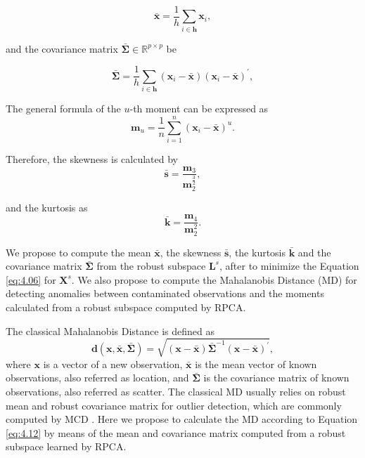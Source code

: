 \begin{equation}\label{eq:4.07}
	\bar{\pmb{x}} = \displaystyle\frac{1}{h}\displaystyle\sum_{i\in \pmb{h}} \pmb{x}_i, 
\end{equation}

and the covariance matrix $\bar{\pmb{\Sigma}} \in \mathbb{R}^{p \times p}$ be

\begin{equation}\label{eq:4.08}
	\bar{\pmb{\Sigma}} = \displaystyle\frac{1}{h}\displaystyle\sum_{i\in \pmb{h}} (\pmb{x}_i - \bar{\pmb{x}})(\pmb{x}_i - \bar{\pmb{x}})^\prime,
\end{equation}

The general formula of the $u$-th moment can be expressed as
\begin{equation}\label{eq:4.09}
	\pmb{m}_u = \displaystyle\frac{1}{n}\displaystyle\sum_{i = 1}^{n}(\pmb{x}_i - \bar{\pmb{x}})^u.
\end{equation}

Therefore, the skewness is calculated by
\begin{equation}\label{eq:4.10}
	\bar{\pmb{s}} = \frac{\pmb{m}_3}{\pmb{m}_2^{\frac{3}{2}}},
\end{equation}

and the kurtosis as
\begin{equation}\label{eq:4.11}
	\bar{\pmb{k}} = \frac{\pmb{m}_4}{\pmb{m}_2^2}.
\end{equation}

We propose to compute the mean $\bar{\pmb{x}}$, the skewness $\bar{\pmb{s}}$, the kurtosis $\bar{\pmb{k}}$ and the covariance matrix $\bar{\pmb{\Sigma}}$ from the robust subspace $\pmb{L}^s$, after to minimize the Equation \ref{eq:4.06} for $\pmb{X}^s$. We also propose to compute the Mahalanobis Distance (MD) for detecting anomalies between contaminated observations and the moments calculated from a robust subspace computed by RPCA. 

The classical Mahalanobis Distance is defined as		
\begin{equation}\label{eq:4.12}
	\pmb{d}(\pmb{x},\bar{\pmb{x}}, \bar{\pmb{\Sigma}}) = \sqrt{(\pmb{x} - \bar{\pmb{x}}) \bar{\pmb{\Sigma}}^{-1}(\pmb{x} - \bar{\pmb{x}})^\prime},
\end{equation}
where $\pmb{x}$ is a vector of a new observation, $\bar{\pmb{x}}$ is the mean vector of known observations, also referred as location, and $\bar{\pmb{\Sigma}}$ is the covariance matrix of known observations, also referred as scatter. The classical MD usually relies on robust mean and robust covariance matrix for outlier detection, which are commonly computed by MCD \cite{rousseeuw1984mcd, rousseeuw1999fastmcd}. Here we propose to calculate the MD according to Equation \ref{eq:4.12} by means of the mean and covariance matrix computed from a robust subspace learned by RPCA. 

